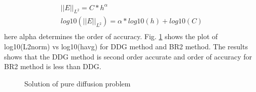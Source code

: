 \documentclass[12pt]{elsarticle}
\begin{document}
\begin{equation}
\begin{gathered}
||E||_{L^2}=C*h^{\alpha}\\
log10(||E||_{L^2})={\alpha}*log10(h)+log10(C)\\
\end{gathered}
\end{equation}
here alpha determines the order of accuracy. Fig. \ref{errorfun} shows the plot of log10(L2norm) vs log10(havg) for DDG method and BR2 method. The results shows that the DDG method is second order accurate and order of accuracy for BR2 method is less than DDG.

\begin{figure}[ht]
\centering
{}
%
%
\caption{Solution of pure diffusion problem }
\label{errorfun}
\end{figure}
\end{document}
